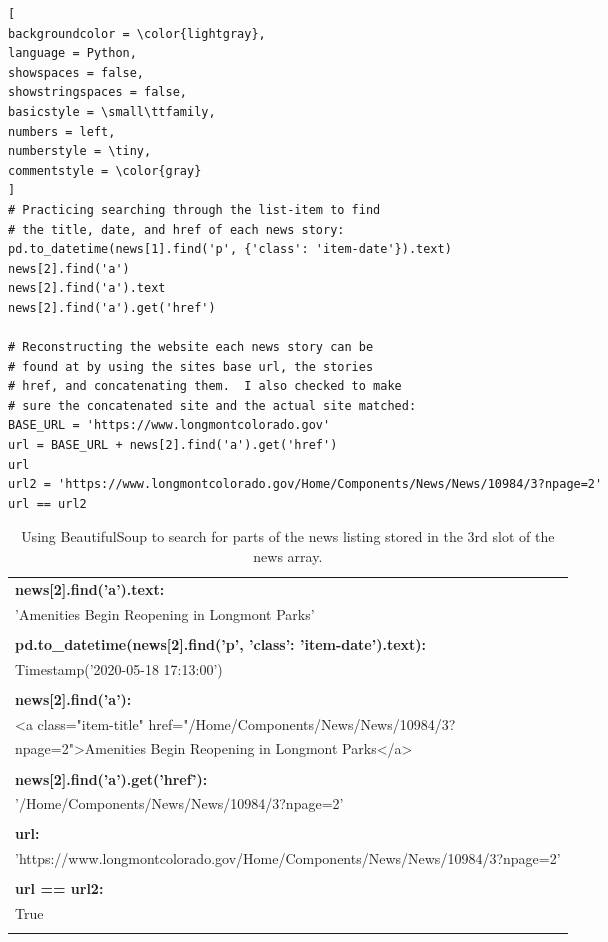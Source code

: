 \documentclass[]{article}
\begin{document}
\begin{lstlisting}[
backgroundcolor = \color{lightgray},
language = Python,
showspaces = false,
showstringspaces = false,
basicstyle = \small\ttfamily,
numbers = left,
numberstyle = \tiny,
commentstyle = \color{gray}
]
# Practicing searching through the list-item to find
# the title, date, and href of each news story:
pd.to_datetime(news[1].find('p', {'class': 'item-date'}).text)
news[2].find('a')
news[2].find('a').text
news[2].find('a').get('href')

# Reconstructing the website each news story can be
# found at by using the sites base url, the stories
# href, and concatenating them.  I also checked to make
# sure the concatenated site and the actual site matched:
BASE_URL = 'https://www.longmontcolorado.gov'
url = BASE_URL + news[2].find('a').get('href')
url
url2 = 'https://www.longmontcolorado.gov/Home/Components/News/News/10984/3?npage=2'
url == url2
\end{lstlisting}
\pagebreak
\begin{table}[!ht]
	\begin{center}
		\caption{Using BeautifulSoup to search for parts of the news listing stored in the 3rd slot of the news array.}
		\label{tab:table1}
		\begin{tabular}{|l|} 
			\hline

\textbf{news[2].find('a').text:}\\
'Amenities Begin Reopening in Longmont Parks'\\
\\
\hline
\textbf{pd.to\_datetime(news[2].find('p', {'class': 'item-date'}).text):}\\
Timestamp('2020-05-18 17:13:00')\\
\\
\hline
\textbf{news[2].find('a'):}\\
<a class="item-title" href="/Home/Components/News/News/10984/3?\\
npage=2">Amenities Begin Reopening in Longmont Parks</a>\\

\\
\hline
\textbf{news[2].find('a').get('href'):}\\
'/Home/Components/News/News/10984/3?npage=2'\\
\\
\hline
\textbf{url:}\\
'https://www.longmontcolorado.gov/Home/Components/News/News/10984/3?npage=2'\\
\\
			\hline
\textbf{	url == url2:}\\
	True\\
	\\
			\hline
		\end{tabular}
	\end{center}
\end{table}
\end{document}
